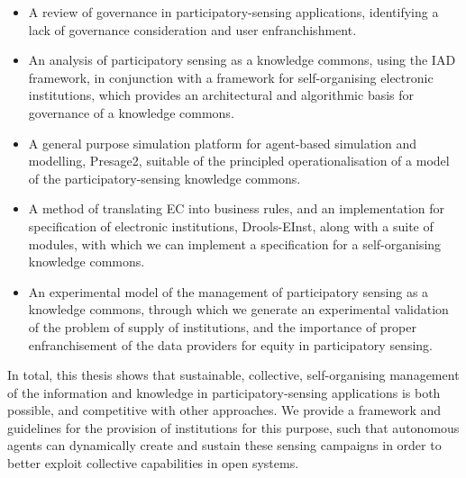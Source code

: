 \begin{itemize}
\item A review of governance in participatory-sensing applications, identifying a lack of governance consideration and user enfranchishment.
\item An analysis of participatory sensing as a knowledge commons, using the \ac{IAD} framework, in conjunction with a framework for self-organising electronic institutions, which provides an architectural and algorithmic basis for governance of a knowledge commons.
\item A general purpose simulation platform for agent-based simulation and modelling, Presage2, suitable of the principled operationalisation of a model of the participatory-sensing knowledge commons.
\item A method of translating \acl{EC} into business rules, and an implementation for specification of electronic institutions, Drools-EInst, along with a suite of modules, with which we can implement a specification for a self-organising knowledge commons.
\item An experimental model of the management of participatory sensing as a knowledge commons, through which we generate an experimental validation of the problem of supply of institutions, and the importance of proper enfranchisement of the data providers for equity in participatory sensing.
\end{itemize}

In total, this thesis shows that sustainable, collective, self-organising
management of the information and knowledge in participatory-sensing
applications is both possible, and competitive with other approaches. We
provide a framework and guidelines for the provision of institutions for this
purpose, such that autonomous agents can dynamically create and sustain these
sensing campaigns in order to better exploit collective capabilities in open
systems.
